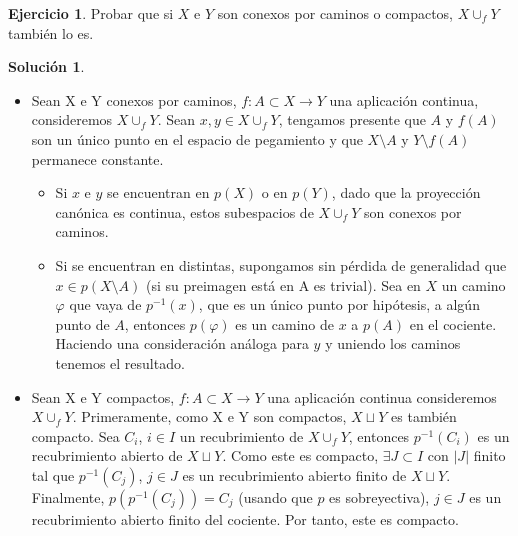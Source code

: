 \documentclass{article}
\theoremstyle{plain}
\theoremstyle{definition}
\newtheorem{exercise}{Ejercicio}
\newtheorem*{sol*}{Solución}
\begin{document}
\newpage
\begin{exercise}
Probar que si $X$ e $Y$ son conexos por caminos o compactos, $X \cup_f Y$ también lo es.
\end{exercise}
\begin{sol*}\mbox{}
\begin{itemize}
\item Sean X e Y conexos por caminos, $f:A\subset X\to Y$ una aplicación continua, consideremos $X \cup_f Y$. Sean $x,y\in X \cup_f Y$, tengamos presente que $A$ y $f(A)$ son un único punto en el espacio de pegamiento y que $X\setminus A$ y $Y\setminus f(A)$ permanece constante.
\begin{itemize}
\item Si $x$ e $y$ se encuentran en $p(X)$ o en $p(Y)$, dado que la proyección canónica es continua, estos subespacios de $X \cup_f Y$ son conexos por caminos.
\item Si se encuentran en distintas, supongamos sin pérdida de generalidad que $x\in p(X\setminus A)$ (si su preimagen está en A es trivial). Sea en $X$ un camino $\varphi$ que vaya de $p^{-1}(x)$, que es un único punto por hipótesis, a algún punto de $A$, entonces $p(\varphi)$ es un camino de $x$ a $p(A)$ en el cociente. Haciendo una consideración análoga para $y$ y uniendo los caminos tenemos el resultado.
\end{itemize}
\item Sean X e Y compactos, $f:A\subset X\to Y$ una aplicación continua consideremos $X \cup_f Y$. Primeramente, como X e Y son compactos, $X\sqcup Y$ es también compacto. Sea $C_i$, $i\in I$ un recubrimiento de $X \cup_f Y$, entonces $p^{-1}(C_i)$ es un recubrimiento abierto de $X\sqcup Y$. Como este es compacto, $\exists J \subset I$ con $|J|$ finito tal que $p^{-1}(C_j)$, $j\in J$ es un recubrimiento abierto finito de $X\sqcup Y$. Finalmente, $p(p^{-1}(C_j))=C_j$ (usando que $p$ es sobreyectiva), $j\in J$ es un recubrimiento abierto finito del cociente. Por tanto, este es compacto.
\end{itemize}
\end{sol*}
\end{document}
